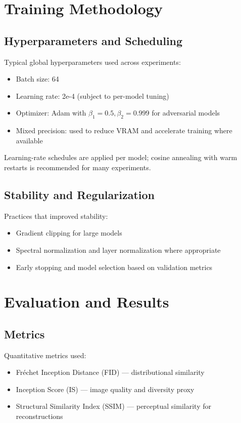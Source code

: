 \documentclass[12pt,a4paper]{report}
\begin{document}
\chapter{Training Methodology}

\section{Hyperparameters and Scheduling}

Typical global hyperparameters used across experiments:
\begin{itemize}
  \item Batch size: 64
  \item Learning rate: 2e-4 (subject to per-model tuning)
  \item Optimizer: Adam with $\beta_1=0.5, \beta_2=0.999$ for adversarial models
  \item Mixed precision: used to reduce VRAM and accelerate training where available
\end{itemize}

Learning-rate schedules are applied per model; cosine annealing with warm restarts is recommended for many experiments.

\section{Stability and Regularization}

Practices that improved stability:
\begin{itemize}
  \item Gradient clipping for large models
  \item Spectral normalization and layer normalization where appropriate
  \item Early stopping and model selection based on validation metrics
\end{itemize}

\chapter{Evaluation and Results}

\section{Metrics}

Quantitative metrics used:
\begin{itemize}
  \item Fr\'echet Inception Distance (FID) — distributional similarity
  \item Inception Score (IS) — image quality and diversity proxy
  \item Structural Similarity Index (SSIM) — perceptual similarity for reconstructions
\end{itemize}
\end{document}
